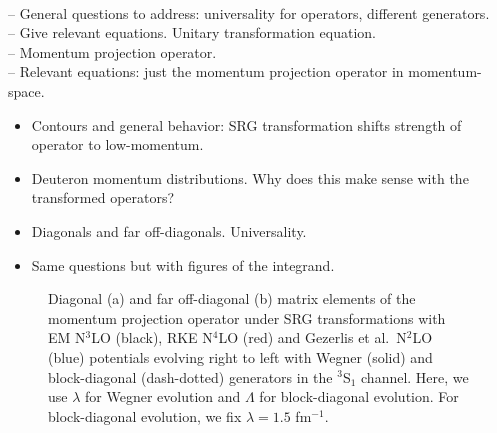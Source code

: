 \documentclass[preprintnumbers,floatfix,aps,prc,preprint,nofootinbib]{revtex4-1}
\begin{document}
\\
-- General questions to address: universality for operators, different generators.
\\
-- Give relevant equations. Unitary transformation equation.
\\
-- Momentum projection operator.
\\
-- Relevant equations: just the momentum projection operator in momentum-space.
%
\begin{itemize}
	\item Contours and general behavior: SRG transformation shifts strength of operator to low-momentum.
	\item Deuteron momentum distributions. Why does this make sense with the transformed operators?
	\item Diagonals and far off-diagonals. Universality.
	\item Same questions but with figures of the integrand.
\end{itemize}
%
\begin{figure}[H]
	\centering
	
	\caption{Diagonal (a) and far off-diagonal (b) matrix elements of the momentum projection operator under SRG transformations with EM N$^3$LO (black), RKE N$^4$LO (red) and Gezerlis et al.~N$^2$LO (blue) potentials evolving right to left with Wegner (solid) and block-diagonal (dash-dotted) generators in the $^3$S$_1$ channel. Here, we use $\lambda$ for Wegner evolution and $\Lambda$ for block-diagonal evolution. For block-diagonal evolution, we fix $\lambda=1.5$ fm$^{-1}$.}
	\label{fig:momentum_proj_3S1}
\end{figure}
\end{document}
